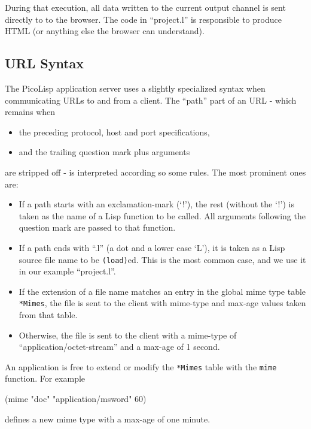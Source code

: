 During that execution, all data written to the current output channel is
sent directly to to the browser. The code in ``project.l'' is responsible
to produce HTML (or anything else the browser can understand).

\subsection{URL Syntax}
\label{sec:appl-devel-url-syntax}

The PicoLisp application server uses a slightly specialized syntax when
communicating URLs to and from a client. The ``path'' part of an URL -
which remains when

\begin{itemize}
\item the preceding protocol, host and port specifications,
\item and the trailing question mark plus arguments
\end{itemize}

are stripped off - is interpreted according so some rules. The most
prominent ones are:

\begin{itemize}
\item If a path starts with an exclamation-mark (`!'), the rest (without
   the `!') is taken as the name of a Lisp function to be called. All
   arguments following the question mark are passed to that function.
\item If a path ends with ``.l'' (a dot and a lower case `L'), it is taken as
   a Lisp source file name to be \texttt{(load)}ed. This is the most common
   case, and we use it in our example ``project.l''.
\item If the extension of a file name matches an entry in the global mime
   type table \texttt{*Mimes}, the file is sent to the client with mime-type
   and max-age values taken from that table.
\item Otherwise, the file is sent to the client with a mime-type of
   ``application/octet-stream'' and a max-age of 1 second.
\end{itemize}

An application is free to extend or modify the \texttt{*Mimes} table with the
\texttt{mime} function. For example


\begin{wideverbatim}
(mime "doc" "application/msword" 60)
\end{wideverbatim}

defines a new mime type with a max-age of one minute.

